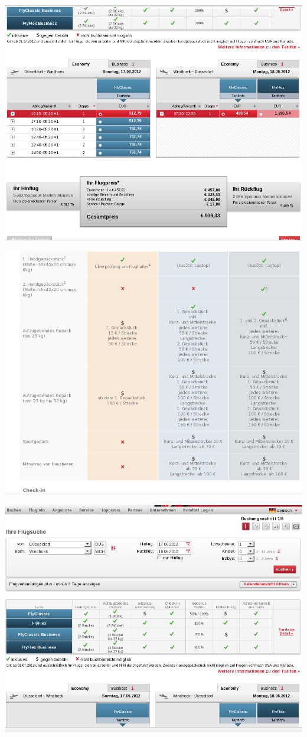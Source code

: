 \documentclass[11pt]{article}
\begin{document}
\includegraphics[scale=0.45]{Flug_Air_Berlin/Bildschirmfoto_am_2012-06-13_14_47_22.png} 

\includegraphics[scale=0.45]{Flug_Air_Berlin/Bildschirmfoto_am_2012-06-13_14_47_26.png} 

\includegraphics[scale=0.45]{Flug_Air_Berlin/Bildschirmfoto_am_2012-06-13_14_47_43.png} 
\end{document}
